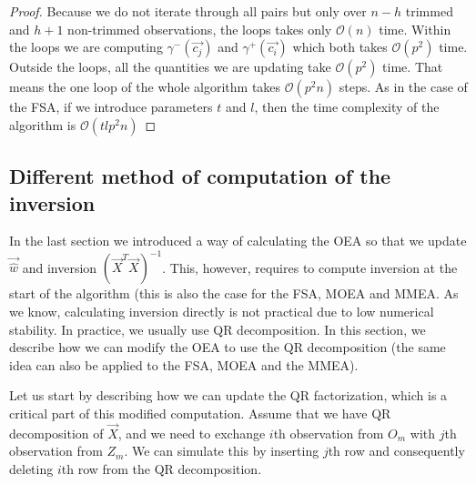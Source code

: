 \begin{proof}
    Because we do not iterate through all pairs but only over $n-h$ trimmed and $h+1$  non-trimmed observations, the loops takes only $\mathcal{O}(n)$ time. Within the loops we are computing $\gamma^{-}(\vec{c_j}) $ and $\gamma^{+}(\vec{c_i})$ which both takes $\mathcal{O}(p^2)$ time. Outside the loops, all the quantities we are updating take $\mathcal{O}(p^2)$ time.
That means the one loop of the whole algorithm takes $\mathcal{O}(p^2n)$ steps.
As in the case of the FSA, if we introduce parameters $t$ and $l$, then the time complexity of the algorithm is $\mathcal{O}(tlp^2n)$
\end{proof}








\subsection{Different method of computation of the inversion} \label{differentcomputation}
In the last section we introduced a way of calculating the OEA so that we update $\vec{\hat{w}}$ and inversion $(\vec{X}^T \vec{X})^{-1}$. This, however, requires to compute inversion at the start of the algorithm (this is also the case for the FSA, MOEA and MMEA. As we know, calculating inversion directly is not practical due to low numerical stability. In practice, we usually use QR decomposition. In this section, we describe how we can modify the OEA to use the QR decomposition (the same idea can also be applied to the FSA, MOEA and the MMEA). 

Let us start by describing how we can update the QR factorization, which is a critical part of this modified computation. Assume that we have QR decomposition of $\vec{X}$, and we need to exchange $i$th observation from $O_m$ with $j$th observation from $Z_m$. We can simulate this by inserting $j$th row and consequently deleting $i$th row from the QR decomposition. 



